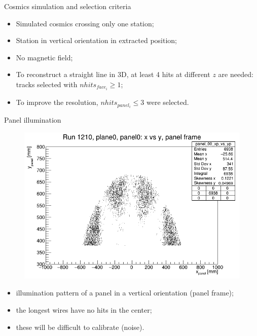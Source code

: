 \documentclass{beamer}[10pt]
\begin{document}
\begin{frame}{Cosmics simulation and selection criteria}
  \begin{itemize}
    \item Simulated cosmics crossing only one station;
    \vspace{3mm}
    \item Station in vertical orientation in extracted position;
    \vspace{3mm}
    \item No magnetic field;
    \vspace{3mm}
    \item To reconstruct a straight line in 3D, at least 4 hits at different $z$ are needed: tracks selected with $nhits_{face_i}\geq 1$;
    \vspace{3mm}
    \item To improve the resolution, $nhits_{panel_i}\leq 3$ were selected.
  \end{itemize}
\end{frame}
\begin{frame}{Panel illumination}
   \vspace{-3mm}
            \begin{figure}[H]
                \centering
                \includegraphics[width=0.8 \textwidth]{figures/pdf/xp_vs_yp_panel0.png}
                \label{fig:enter-label}
            \end{figure}
\begin{itemize}
  \item illumination pattern of a panel in a vertical orientation (panel frame);
  \item the longest wires have no hits in the center;
  \item these will be difficult to calibrate (noise).
\end{itemize}

\end{frame}
\end{document}
